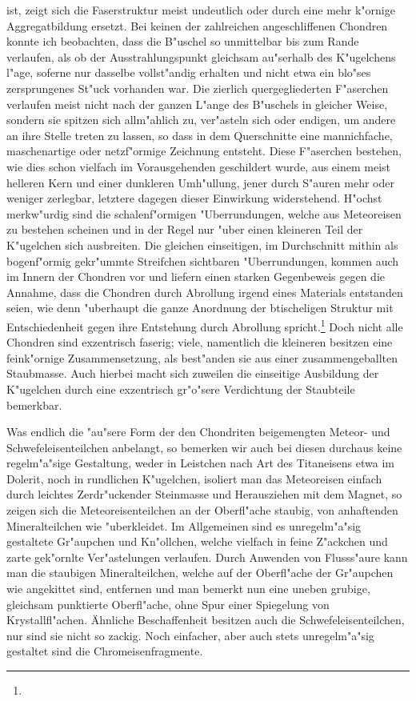 \documentclass[a4paper, 11pt, oneside]{article}
\begin{document}
ist, zeigt sich die Faserstruktur meist undeutlich oder durch eine mehr k"ornige Aggregatbildung ersetzt. Bei keinen der zahlreichen angeschliffenen Chondren konnte ich beobachten, dass die B"uschel so unmittelbar bis zum Rande verlaufen, als ob der Ausstrahlungspunkt gleichsam au"serhalb des K"ugelchens l"age, soferne nur dasselbe vollst"andig erhalten und nicht etwa ein blo"ses zersprungenes St"uck vorhanden war. Die zierlich quergegliederten F"aserchen verlaufen meist nicht nach der ganzen L"ange des B"uschels in gleicher Weise, sondern sie spitzen sich allm"ahlich zu, ver"asteln sich oder endigen, um andere an ihre Stelle treten zu lassen, so dass in dem Querschnitte eine mannichfache, maschenartige oder netzf"ormige Zeichnung entsteht. Diese F"aserchen bestehen, wie dies schon vielfach im Vorausgehenden geschildert wurde, aus einem meist helleren Kern und einer dunkleren Umh"ullung, jener durch S"auren mehr oder weniger zerlegbar, letztere dagegen dieser Einwirkung widerstehend. H"ochst merkw"urdig sind die schalenf"ormigen "Uberrundungen, welche aus Meteoreisen zu bestehen scheinen und in der Regel nur "uber einen kleineren Teil der K"ugelchen sich ausbreiten. Die gleichen einseitigen, im Durchschnitt mithin als bogenf"ormig gekr"ummte Streifchen sichtbaren "Uberrundungen, kommen auch im Innern der Chondren vor und liefern einen starken Gegenbeweis gegen die Annahme, dass die Chondren durch Abrollung irgend eines Materials entstanden seien, wie denn "uberhaupt die ganze Anordnung der btischeligen Struktur mit Entschiedenheit gegen ihre Entstehung durch Abrollung spricht.\footnote{} Doch nicht alle Chondren sind exzentrisch faserig; viele, namentlich die kleineren besitzen eine feink"ornige Zusammensetzung, als best"anden sie aus einer zusammengeballten Staubmasse. Auch hierbei macht sich zuweilen die einseitige Ausbildung der K"ugelchen durch eine exzentrisch gr"o"sere Verdichtung der Staubteile bemerkbar.

Was endlich die "au"sere Form der den Chondriten beigemengten Meteor- und Schwefeleisenteilchen anbelangt, so bemerken wir auch bei diesen durchaus keine regelm"a"sige Gestaltung, weder in Leistchen nach Art des Titaneisens etwa im Dolerit, noch in rundlichen K"ugelchen, isoliert man das Meteoreisen einfach durch leichtes Zerdr"uckender Steinmasse und Herausziehen mit dem Magnet, so zeigen sich die Meteoreisenteilchen an der Oberfl"ache staubig, von anhaftenden Mineralteilchen wie "uberkleidet. Im Allgemeinen sind es unregelm"a"sig gestaltete Gr"aupchen und Kn"ollchen, welche vielfach in feine Z"ackchen und zarte gek"ornlte Ver"astelungen verlaufen. Durch Anwenden von Flusss"aure kann man die staubigen Mineralteilchen, welche auf der Oberfl"ache der Gr"aupchen wie angekittet sind, entfernen und man bemerkt nun eine uneben grubige, gleichsam punktierte Oberfl"ache, ohne Spur einer Spiegelung von Krystallfl"achen. Ähnliche Beschaffenheit besitzen auch die Schwefeleisenteilchen, nur sind sie nicht so zackig. Noch einfacher, aber auch stets unregelm"a"sig gestaltet sind die Chromeisenfragmente.
\end{document}
